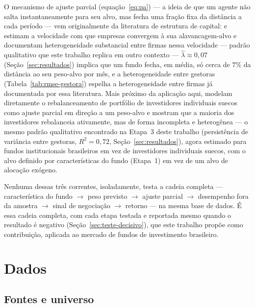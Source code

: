 \documentclass[11pt,a4paper]{article}
\begin{document}
O mecanismo de ajuste parcial (equação~\eqref{eq:pa}) --- a ideia de que um agente não salta
instantaneamente para seu alvo, mas fecha uma fração fixa da distância a cada período --- vem
originalmente da literatura de estrutura de capital:  e
 estimam a velocidade com que empresas convergem à sua alavancagem-alvo
e documentam heterogeneidade substancial entre firmas nessa velocidade --- padrão qualitativo que
este trabalho replica em outro contexto --- $\widehat\lambda\approx0{,}07$ (Seção~\ref{sec:resultados})
implica que um fundo
fecha, em média, só cerca de $7\%$ da distância ao seu peso-alvo por mês, e a heterogeneidade
entre gestoras (Tabela~\ref{tab:rmse-gestora}) espelha a heterogeneidade entre firmas já
documentada por essa literatura. Mais próximo da aplicação aqui,  modelam
diretamente o rebalanceamento de portfólio de investidores individuais suecos como ajuste parcial
em direção a um peso-alvo e mostram que a maioria dos investidores rebalanceia ativamente, mas de
forma incompleta e heterogênea --- o mesmo padrão qualitativo encontrado na Etapa~3 deste
trabalho (persistência de variância entre gestoras, $R^2=0{,}72$, Seção~\ref{sec:resultados}),
agora estimado para fundos institucionais brasileiros em vez de investidores individuais suecos,
com o alvo definido por características do fundo (Etapa~1) em vez de um alvo de alocação
exógeno.

Nenhuma dessas três correntes, isoladamente, testa a cadeia completa --- característica do fundo
$\to$ peso previsto $\to$ ajuste parcial $\to$ desempenho fora da amostra $\to$ sinal de
negociação $\to$ retorno --- na mesma base de dados. É essa cadeia completa, com cada etapa
testada e reportada mesmo quando o resultado é negativo (Seção~\ref{sec:teste-decisivo}), que
este trabalho propõe como contribuição, aplicada ao mercado de fundos de investimento brasileiro.

\section{Dados}
\label{sec:dados}

\FloatBarrier
\subsection{Fontes e universo}
\end{document}
